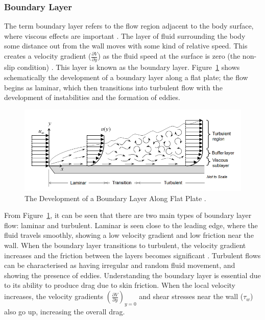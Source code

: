 \subsubsection{Boundary Layer}
The term boundary layer refers to the flow region adjacent to the body surface, where viscous effects are important \cite{Anderson2010FundamentalsAerodynamics}. The layer of fluid surrounding the body some distance out from the wall moves with some kind of relative speed. This creates a velocity gradient ($\frac{\partial V}{\partial y}$) as the fluid speed at the surface is zero (the non-slip condition)  \cite{Scibor-Rylski1984RoadAerodynamics}. This layer is known as the boundary layer. Figure~\ref{fig:3} shows schematically the development of a boundary layer along a flat plate; the flow begins as laminar, which then transitions into turbulent flow with the development of instabilities and the formation of eddies.

\begin{figure}[!htb]
    \centering
    \includegraphics[scale=0.6]{Figures/BL_laminar_turbulent.png}
    \caption{The Development of a Boundary Layer Along Flat Plate \cite{Frei2017WhichApplication}.}
    \label{fig:3}
\end{figure}

 
\noindent From Figure~\ref{fig:3}, it can be seen that there are two main types of boundary layer flow: laminar and turbulent. Laminar is seen close to the leading edge, where the fluid travels smoothly, showing a low velocity gradient and low friction near the wall. When the boundary layer transitions to turbulent, the velocity gradient increases and the friction between the layers becomes significant \cite{Scibor-Rylski1984RoadAerodynamics}. Turbulent flows can be characterised as having irregular and random fluid movement, and showing the presence of eddies. Understanding the boundary layer is essential due to its ability to produce drag due to skin friction. When the local velocity increases, the velocity gradients $(\frac{\partial V}{\partial y})_{y=0} $ and shear stresses near the wall ($\tau_w $) also go up, increasing the overall drag.

